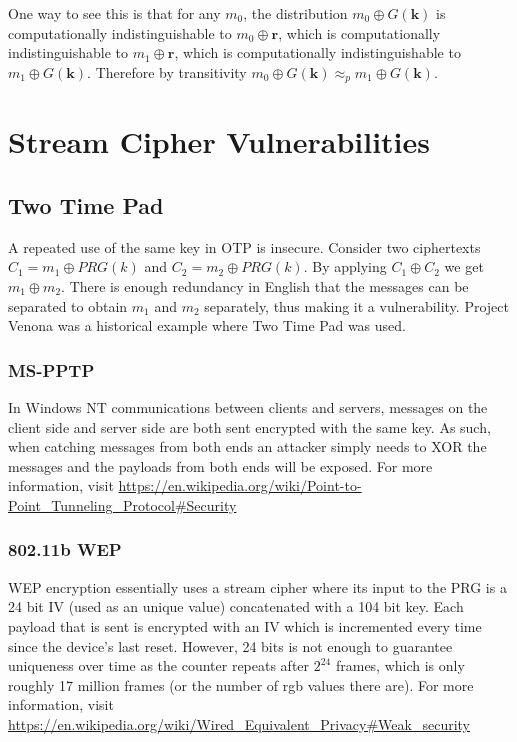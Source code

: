 \documentclass{article}
\begin{document}
\begin{multicols}{2}
One way to see this is that for any $m_0$, the distribution $m_0 \oplus G(\mathbf{k})$ is computationally indistinguishable to $m_0 \oplus \mathbf{r}$, which is computationally indistinguishable to $m_1 \oplus \mathbf{r}$, which is computationally indistinguishable to $m_1 \oplus G(\mathbf{k})$. Therefore by transitivity $m_0 \oplus G(\mathbf{k}) \approx_p m_1 \oplus G(\mathbf{k})$.

\section{Stream Cipher Vulnerabilities}

\subsection{Two Time Pad}

A repeated use of the same key in OTP is insecure. Consider two ciphertexts $C_1 = m_1 \oplus PRG(k)$ and $C_2 = m_2 \oplus PRG(k)$. By applying $C_1 \oplus C_2$ we get $m_1 \oplus m_2$. There is enough redundancy in English that the messages can be separated to obtain $m_1$ and $m_2$ separately, thus making it a vulnerability. Project Venona was a historical example where Two Time Pad was used.

\subsubsection{MS-PPTP}

In Windows NT communications between clients and servers, messages on the client side and server side are both sent encrypted with the same key. As such, when catching messages from both ends an attacker simply needs to XOR the messages and the payloads from both ends will be exposed. For more information, visit \url{https://en.wikipedia.org/wiki/Point-to-Point_Tunneling_Protocol#Security}

\subsubsection{802.11b WEP}

WEP encryption essentially uses a stream cipher where its input to the PRG is a 24 bit IV (used as an unique value) concatenated with a 104 bit key. Each payload that is sent is encrypted with an IV which is incremented every time since the device's last reset. However, 24 bits is not enough to guarantee uniqueness over time as the counter repeats after $2^24$ frames, which is only roughly 17 million frames (or the number of rgb values there are). For more information, visit \url{https://en.wikipedia.org/wiki/Wired_Equivalent_Privacy#Weak_security}


\end{multicols}
\end{document}

